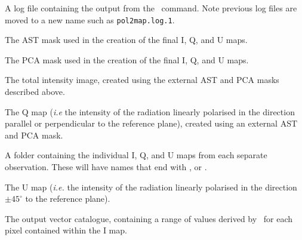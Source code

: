 \begin{aligndesc}
\item[\file{pol2map.log}] A log file containing the output from the
  \poltwomap\ command. Note previous log files are moved to a new name
  such as \texttt{pol2map.log.1}.

\item[\file{astmask.sdf}] The AST mask used in the creation
  of the final I, Q, and U maps.

\item[\file{pcamask.sdf}] The PCA mask used in the creation of the
  final I, Q, and U maps.

\item[\file{iext.sdf}] The total intensity image, created using the
  external AST and PCA masks described above.

\item[\file{qext.sdf}] The Q map (\emph{i.e} the intensity of the radiation
  linearly polarised in the direction parallel or perpendicular to the
  reference plane), created using an external AST and PCA mask.

\item[\file{maps/}] A folder containing the individual I, Q, and U
  maps from each separate observation. These will have names that end with
  ,  or .

\item[\file{uext.sdf}] The U map (\emph{i.e.} the intensity of the radiation
  linearly polarised in the direction $\pm45^{\circ }$ to the reference plane).

\item[\file{mycat.FIT}] The output vector catalogue, containing a
  range of values derived by \poltwomap\ for each pixel contained within
  the I map.

\end{aligndesc}


